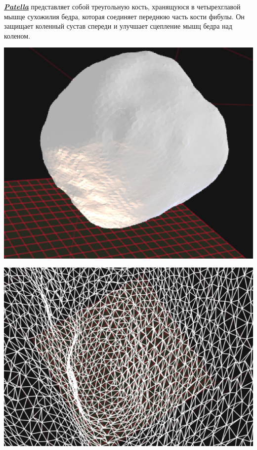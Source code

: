 \documentclass[a4paper, 12pt]{article}   	%
\begin{document}
    \textit{\textbf{\underline{Patella}}} представляет собой треугольную кость, хранящуюся в четырехглавой мышце сухожилия бедра, которая соединяет переднюю часть кости фибулы. Он защищает коленный сустав спереди и улучшает сцепление мышц бедра над коленом.
    \begin{center}
        \begin{minipage}{0.7\linewidth}
            \includegraphics[width=\linewidth]{img/patella-stl}
        \end{minipage}
    \end{center}
    
    \begin{center}
        \begin{minipage}{0.7\linewidth}
            \includegraphics[width=\linewidth]{img/patella-stl-triangular}
        \end{minipage}
    \end{center}
    
\end{document}
